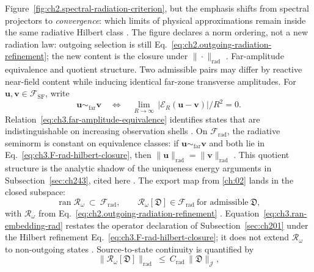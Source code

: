 Figure~\ref{fig:ch2.spectral-radiation-criterion}, but the emphasis shifts from spectral projectors to
\emph{convergence}: which limits of physical approximations remain inside the same radiative Hilbert
class \cite{stratton1941}. The figure declares a norm ordering, not a
new radiation law: outgoing selection is still Eq.~\eqref{eq:ch2.outgoing-radiation-refinement}; the new
content is the closure under \(\|\cdot\|_{\mathrm{rad}}\) \cite{stratton1941}.
Far-amplitude equivalence and quotient structure. Two admissible pairs may differ by reactive near-field content while inducing identical far-zone
transverse amplitudes. For \(\mathbf{u},\mathbf{v}\in\mathcal{F}_{\mathrm{SF}}\), write
\begin{equation}
\label{eq:ch3.far-amplitude-equivalence}
\mathbf{u}\sim_{\mathrm{far}}\mathbf{v}
\quad\Longleftrightarrow\quad
\lim_{R\to\infty}\,
\big|\mathcal{E}_{R}(\mathbf{u}-\mathbf{v})\big|/R^{2}=0.
\end{equation}
Relation~\eqref{eq:ch3.far-amplitude-equivalence} identifies states that are indistinguishable on
increasing observation shells \cite{stratton1941}. On \(\mathcal{F}_{\mathrm{rad}}\), the
radiative seminorm is constant on equivalence classes: if \(\mathbf{u}\sim_{\mathrm{far}}\mathbf{v}\) and both
lie in Eq.~\eqref{eq:ch3.F-rad-hilbert-closure}, then
\(\|\mathbf{u}\|_{\mathrm{rad}}=\|\mathbf{v}\|_{\mathrm{rad}}\) \cite{stratton1941}. This quotient
structure is the analytic shadow of the uniqueness energy arguments in Subsection~\ref{sec:ch243}, cited
here \cite{stratton1941}.
The export map from \ref{ch:02} lands in the closed subspace:
\begin{equation}
\label{eq:ch3.ran-embedding-rad}
\operatorname{ran}\mathcal{R}_\omega
\ \subset\
\mathcal{F}_{\mathrm{rad}},
\qquad
\mathcal{R}_\omega[\mathfrak{D}]
\in
\mathcal{F}_{\mathrm{rad}}
\ \text{for admissible}\ \mathfrak{D},
\end{equation}
with \(\mathcal{R}_\omega\) from Eq.~\eqref{eq:ch2.outgoing-radiation-refinement} \cite{stratton1941}.
Equation~\eqref{eq:ch3.ran-embedding-rad} restates the operator declaration of
Subsection~\ref{sec:ch201} under the Hilbert refinement Eq.~\eqref{eq:ch3.F-rad-hilbert-closure}; it does
not extend \(\mathcal{R}_\omega\) to non-outgoing states \cite{stratton1941}. Source-to-state continuity is
quantified by
\begin{equation}
\label{eq:ch3.source-to-rad-energy-bound}
\|\mathcal{R}_\omega[\mathfrak{D}]\|_{\mathrm{rad}}
\ \le\
C_{\mathrm{rad}}\,\|\mathfrak{D}\|_{\mathcal{J}},
\end{equation}

